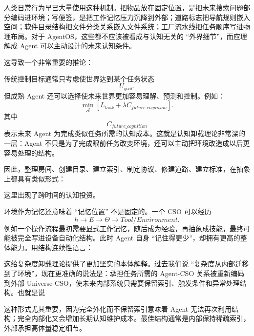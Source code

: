 人类日常行为早已大量使用这种机制。把物品放在固定位置，是把未来搜索问题部分编码进环境；写便签，是把工作记忆压力沉降到外部；道路标志把导航规则嵌入空间；软件目录结构把文件分类关系嵌入文件系统；工厂流水线把任务顺序写进物理布局。对于 AgentOS，这些都不应该被看成与认知无关的 ``外界细节''，而应理解成 Agent 可以主动设计的未来认知条件。

这导致一个非常重要的推论：
\begin{statementbox}
\centering
{}
\end{statementbox}
传统控制目标通常只考虑使世界达到某个任务状态
\[
U_{goal}.
\]
但成熟 Agent 还可以选择使未来世界更加容易理解、预测和控制。例如：
\[
\min_{\mathcal A}
\left[
L_{task}
+
\lambda C_{future\_cognition}
\right].
\]
其中
\[
C_{future\_cognition}
\]
表示未来 Agent 为完成类似任务所需的认知成本。这就是认知卸载理论非常深的一层：Agent 不只是为了完成眼前任务改变环境，还可以主动把环境改造成以后更容易处理的结构。

因此，整理房间、创建目录、建立索引、制定协议、修建道路、建立标准，在抽象上都具有类似形式：
\begin{statementbox}
\centering
{}
\end{statementbox}
这里出现了跨时间的认知投资。

环境作为记忆还意味着 ``记忆位置'' 不是固定的。一个 CSO 可以经历
\[
h
\rightarrow
E
\rightarrow
\Theta
\rightarrow
Tool/Environment.
\]
例如一个操作流程最初需要显式工作记忆，随后成为经验，再抽象成技能，最终可能被完全写进设备自动化结构。此时 Agent 自身 ``记住得更少''，却拥有更高的整体能力。用结构连续性语言：
\begin{statementbox}
\centering
{}
\end{statementbox}

这给复杂度卸载理论提供了更加坚实的本体解释。过去我们说 ``复杂度从内部迁移到了环境''，现在更准确的说法是：承担任务所需的 Agent-CSO 关系被重新编码到外部 Universe-CSO，使未来内部系统只需要保留索引、触发条件和异常处理结构。也就是说
\begin{statementbox}
\centering
{}
\end{statementbox}
这种形式尤其重要，因为完全外化而不保留索引意味着 Agent 无法再次利用结构；完全内部化又会增加长期认知维护成本。最佳结构通常是内部保持稀疏索引，外部承担高体量稳定细节。

